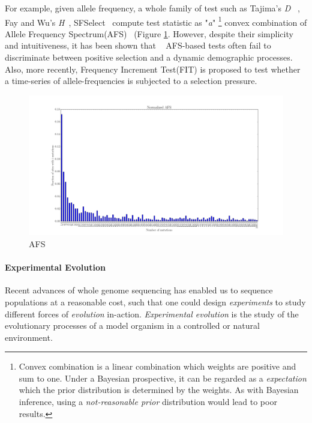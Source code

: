 \documentclass[11pt]{article}
\begin{document}
For example, given allele frequency, a whole family of test such as 
Tajima's \emph{D} ~\cite{tajima1989statistical}, 
Fay and Wu's \emph{H}~\cite{fay2000hitchhiking}, 
SFSelect~\cite{ronen2013learning} compute test statistic as "\emph{a}"
\footnote{Convex combination is a linear combination which weights are positive
	 and sum to one. Under a Bayesian prospective, it can be regarded as a
	  \emph{expectation} which the prior distribution is determined by the
	   weights. As with Bayesian inference, using a \emph{not-reasonable prior}
	    distribution would lead to poor results.} 
	convex 
combination of Allele Frequency Spectrum(AFS)~\cite{achaz2009frequency} 
(Figure \ref{fig:afs}. 
However, despite their simplicity and intuitiveness, it has been shown that
 ~\cite{ptak2002evidence, ramos2002statistical} AFS-based tests often fail 
 to discriminate between positive selection and a dynamic
demographic processes. Also, more recently, Frequency Increment
 Test(FIT) \cite{feder2014Identifying} is  proposed to test whether a
  time-series of allele-frequencies is subjected to a selection pressure.
\begin{figure}
	\centering
	\includegraphics[scale=0.2]{afs}
	\caption{AFS}	\label{fig:afs}
\end{figure}
\paragraph{Experimental Evolution}
Recent advances of whole genome sequencing has enabled us to sequence 
populations at a reasonable cost, such that one could design \emph{experiments} 
to study different forces of \emph{evolution} in-action. \emph{Experimental 
evolution} is the study of the evolutionary processes of a model organism in a 
controlled  
\cite{hegreness2006equivalence,lang2013pervasive,orozco2012adaptation,
	lang2011genetic,barrick2009genome,bollback2007clonal,oz2014strength} 
or natural 
	\cite{maldarelli2013hiv,reid2011new,denef2012situ,winters2012development,
	daniels2013genetic,barrett2008natural,bergland2014genomic} environment.
\end{document}
